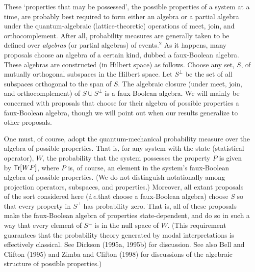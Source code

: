 \documentclass[12pt]{article}
\newcommand{\ie}{{\it i.e.}}         %
\newcommand{\Tr}[1]{\mbox{{\sf Tr}$[#1]$}}                      %
\begin{document}
These `properties that may be possessed', the possible properties of a 
system at a time, are probably best required to form either an algebra 
or a partial algebra under the quantum-algebraic (lattice-theoretic) 
operations of meet, join, and orthocomplement.  After all, probability 
measures are generally taken to be defined over {\it algebras} (or 
partial algebras) of events.$^2$ As it happens, many proposals choose 
an algebra of a certain kind, dubbed a faux-Boolean algebra.  These 
algebras are constructed (in Hilbert space) as follows.  Choose any 
set, $S$, of mutually orthogonal subspaces in the Hilbert space.  Let 
$S^{\perp}$ be the set of all subspaces orthogonal to the span of $S$.  
The algebraic closure (under meet, join, and orthocomplement) of $S 
\cup S^{\perp}$ is a faux-Boolean algebra.  We will mainly be 
concerned with proposals that choose for their algebra of possible 
properties a faux-Boolean algebra, though we will point out when our 
results generalize to other proposals.

One must, of course, adopt the quantum-mechanical probability measure 
over the algebra of possible properties.  That is, for any system with 
the state (statistical operator), $W$, the probability that the system 
possesses the property $P$ is given by $\Tr{WP}$, where $P$ is, of 
course, an element in the system's faux-Boolean algebra of possible 
properties.  (We do not distinguish notationally among projection 
operators, subspaces, and properties.) Moreover, all extant proposals 
of the sort considered here (\ie that choose a faux-Boolean algebra) 
choose $S$ so that every property in $S^{\perp}$ has probability zero.  
That is, all of these proposals make the faux-Boolean algebra of 
properties state-dependent, and do so in such a way that every element 
of $S^{\perp}$ is in the null space of $W$.  (This requirement 
guarantees that the probability theory generated by modal 
interpretations is effectively classical.  See Dickson (1995a, 1995b) 
for discussion.  See also Bell and Clifton (1995) and Zimba and 
Clifton (1998) for discussions of the algebraic structure of possible 
properties.)
\end{document}
